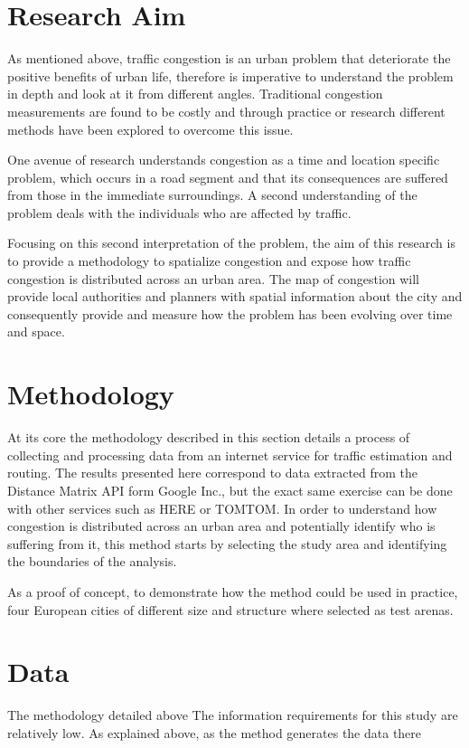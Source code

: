\documentclass[a4paper]{jpconf}
\begin{document}
\section{Research Aim}
\indent As mentioned above, traffic congestion is an urban problem that deteriorate the positive benefits of urban life, therefore is imperative to understand the problem in depth and look at it from different angles. Traditional congestion measurements are found to be costly and through practice or research different methods have been explored to overcome this issue. \par
\indent One avenue of research understands congestion as a time and location specific problem, which occurs in a road segment and that its consequences are suffered from those in the immediate surroundings. A second understanding of the problem deals with the individuals who are affected by traffic. \par
\indent Focusing on this second interpretation of the problem, the aim of this research is to provide a methodology to spatialize congestion and expose how traffic congestion is distributed across an urban area. The map of congestion will provide local authorities and planners with spatial information about the city and consequently provide and measure how the problem has been evolving over time and space.  \par



\section{Methodology}
At its core the methodology described in this section details a process of collecting and processing data from an internet service for traffic estimation and routing. The results presented here correspond to data extracted from the Distance Matrix API form Google Inc., but the exact same exercise can be done with other services such as HERE or TOMTOM.
In order to understand how congestion is distributed across an urban area and potentially identify who is suffering from it, this method starts by selecting the study area and identifying the boundaries of the analysis. 



As a proof of concept, to demonstrate how the method could be used in practice, four European cities of different size and structure where selected as test arenas.  \par


\section{Data}
\indent The methodology detailed above The information requirements for this study are relatively low. As explained above, as the method generates the data there 
\end{document}

